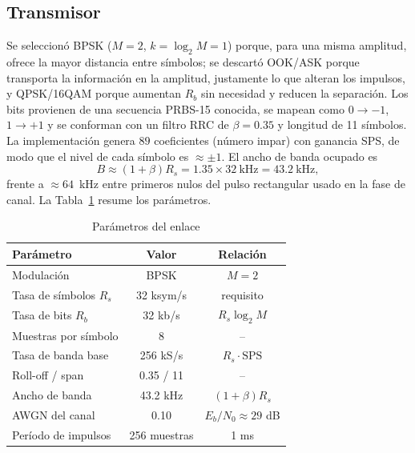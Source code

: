 \subsection{Transmisor}
Se seleccionó BPSK ($M=2$, $k=\log_2 M=1$) porque, para una misma amplitud, ofrece la mayor distancia entre símbolos; se descartó OOK/ASK porque transporta la información en la amplitud, justamente lo que alteran los impulsos, y QPSK/16QAM porque aumentan $R_b$ sin necesidad y reducen la separación. Los bits provienen de una secuencia PRBS-15 conocida, se mapean como $0\rightarrow-1$, $1\rightarrow+1$ y se conforman con un filtro RRC de $\beta=0.35$ y longitud de 11 símbolos. La implementación genera $89$ coeficientes (número impar) con ganancia SPS, de modo que el nivel de cada símbolo es $\approx\pm1$. El ancho de banda ocupado es
\begin{equation}
    B \approx (1+\beta)R_s = 1.35\times 32~\text{kHz} = 43.2~\text{kHz},
    \label{eq:bw}
\end{equation}
frente a $\approx 64$~kHz entre primeros nulos del pulso rectangular usado en la fase de canal. La Tabla~\ref{tab:parametros} resume los parámetros.

\begin{table}[H]
    \centering
    \caption{Parámetros del enlace}
    \label{tab:parametros}
    \footnotesize
    \setlength{\tabcolsep}{4pt}
    \begin{tabular}{@{}lcc@{}}
        \toprule
        \textbf{Parámetro} & \textbf{Valor} & \textbf{Relación} \\
        \midrule
        Modulación & BPSK & $M=2$ \\
        Tasa de símbolos $R_s$ & 32 ksym/s & requisito \\
        Tasa de bits $R_b$ & 32 kb/s & $R_s\log_2 M$ \\
        Muestras por símbolo & 8 & -- \\
        Tasa de banda base & 256 kS/s & $R_s\cdot\text{SPS}$ \\
        Roll-off / span & 0.35 / 11 & -- \\
        Ancho de banda & 43.2 kHz & $(1+\beta)R_s$ \\
        AWGN del canal & 0.10 & $E_b/N_0\approx29$ dB \\
        Período de impulsos & 256 muestras & 1 ms \\
        \bottomrule
    \end{tabular}
\end{table}

